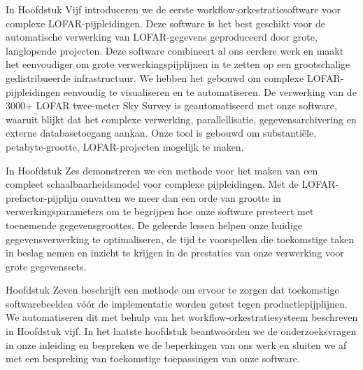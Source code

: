 In Hoofdstuk Vijf introduceren we de eerste workflow-orkestratiesoftware voor complexe LOFAR-pijpleidingen. Deze software is het best geschikt voor de automatische verwerking van LOFAR-gegevens geproduceerd door grote, langlopende projecten. Deze software combineert al ons eerdere werk en maakt het eenvoudiger om grote verwerkingspijplijnen in te zetten op een grootschalige gedistribueerde infrastructuur. We hebben het gebouwd om complexe LOFAR-pijpleidingen eenvoudig te visualiseren en te automatiseren. De verwerking van de 3000+ LOFAR twee-meter Sky Survey is geautomatiseerd met onze software, waaruit blijkt dat het complexe verwerking, parallellisatie, gegevensarchivering en externe databasetoegang aankan. Onze tool is gebouwd om substantiële, petabyte-grootte, LOFAR-projecten mogelijk te maken.

In Hoofdstuk Zes demonstreren we een methode voor het maken van een compleet schaalbaarheidsmodel voor complexe pijpleidingen. Met de LOFAR-prefactor-pijplijn omvatten we meer dan een orde van grootte in verwerkingsparameters om te begrijpen hoe onze software presteert met toenemende gegevensgroottes. De geleerde lessen helpen onze huidige gegevensverwerking te optimaliseren, de tijd te voorspellen die toekomstige taken in beslag nemen en inzicht te krijgen in de prestaties van onze verwerking voor grote gegevenssets.

Hoofdstuk Zeven beschrijft een methode om ervoor te zorgen dat toekomstige softwarebeelden vóór de implementatie worden getest tegen productiepijplijnen. We automatiseren dit met behulp van het workflow-orkestratiesysteem beschreven in Hoofdstuk vijf. In het laatste hoofdstuk beantwoorden we de onderzoeksvragen in onze inleiding en bespreken we de beperkingen van ons werk en sluiten we af met een bespreking van toekomstige toepassingen van onze software.
